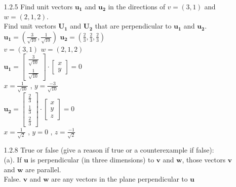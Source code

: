 \documentclass[10pt,twoside,reqno]{article}
\begin{document}
\begin{enumerate}
\item[1.2.5] Find unit vectors $\pmb{u_{1}}$ and $\pmb{u_{2}}$ in the directions of $v = (3, 1)$ and $w = (2, 1, 2)$.\\
Find unit vectors $\pmb{U_{1}}$ and $\pmb{U_{2}}$ that are perpendicular to $\pmb{u_{1}}$ and $\pmb{u_{2}}$.\\
\vspace{3mm}
$\pmb{u_{1}} = (\frac{3}{\sqrt{10}}, \frac{1}{\sqrt{10}})$ \hspace{3mm} $\pmb{u_{2}} = (\frac{2}{3}, \frac{2}{3}, \frac{2}{3})$\\
$v = (3, 1)$ \hspace{13mm} $w = (2, 1, 2)$\\
$\pmb{u_{1}} = \left[\begin{smallmatrix} \frac{3}{\sqrt{10}}\\ \frac{1}{\sqrt{10}} \end{smallmatrix} \right] \cdot \left[\begin{smallmatrix} x\\ y \end{smallmatrix} \right] = 0$\\
$x = \frac{1}{\sqrt{10}}$ , $y = \frac{-3}{\sqrt{10}}$\\
$\pmb{u_{2}} = \left[\begin{smallmatrix} \frac{2}{3}\\ \frac{1}{3}\\ \frac{2}{3} \end{smallmatrix} \right] \cdot \left[\begin{smallmatrix} x\\ y\\ z \end{smallmatrix} \right] = 0$\\
$x = \frac{1}{\sqrt{2}}$ , $y = 0$ , $z = \frac{-1}{\sqrt{2}}$\\
\item[1.2.8] True or false (give a reason if true or a counterexample if false):\\
(a). If $\pmb{u}$ is perpendicular (in three dimensions) to $\pmb{v}$ and $\pmb{w}$, those vectors $\pmb{v}$ and $\pmb{w}$ are parallel.\\
\vspace{2mm}
\hspace{6mm} False. $\pmb{v}$ and $\pmb{w}$ are any vectors in the plane perpendicular to $\pmb{u}$\\
\vspace{2mm}

\end{enumerate}
\end{document}

